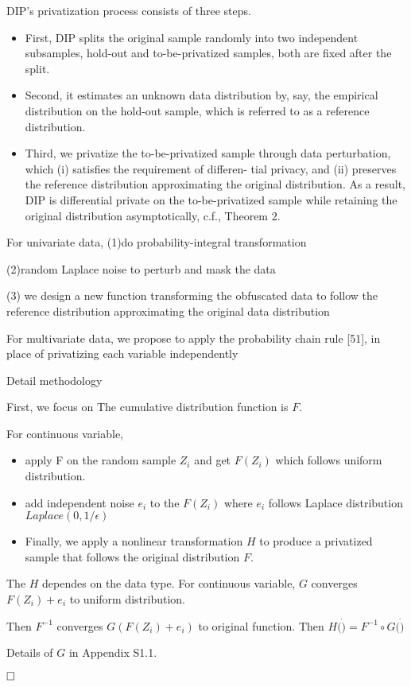
DIP’s privatization process consists of three steps. 
\begin{itemize}
    \item First, DIP splits the original sample randomly into two independent subsamples, hold-out and to-be-privatized samples, both are fixed after the split. 
    \item Second, it estimates an unknown data distribution by, say, the empirical distribution on the hold-out sample, which is referred to as a reference distribution. \item Third, we privatize the to-be-privatized sample through data perturbation, which (i) satisfies the requirement of differen- tial privacy, and (ii) preserves the reference distribution approximating the original distribution. As a result, DIP is differential private on the to-be-privatized sample while retaining the original distribution asymptotically, c.f., Theorem 2.
\end{itemize}



For univariate data, 
(1)do probability-integral transformation

(2)random Laplace noise to perturb and mask the data

(3) we design a new function transforming the obfuscated data to follow the reference distribution approximating the original data distribution


For multivariate data,
we propose to apply the probability chain rule [51], in place of privatizing each variable independently


Detail methodology

First, we focus on  The cumulative distribution function is $F$.

For continuous variable,
\begin{itemize}
    \item apply F on the random sample $Z_i$ and get $F(Z_i)$ which follows uniform distribution.
    \item add independent noise $e_i$ to the $F(Z_i)$ where $e_i$ follows Laplace distribution $Laplace(0,1/\epsilon)$
    \item Finally, we apply a nonlinear transformation $H$ to produce a privatized sample that follows the original distribution $F$.
\end{itemize}

The $H$ dependes on the data type.
For continuous variable,
$G$ converges $F(Z_i) + e_i$ to uniform distribution.

Then $F^{-1}$ converges $G(F(Z_i) + e_i)$ to original function.
Then 
$H(\dot) = F^{-1} \circ G(\dot)$

Details of $G$ in Appendix S1.1.


$\hfill \square$